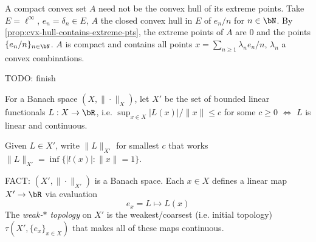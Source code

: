 \begin{example}
  A compact convex set $A$ need not be the convex hull of its extreme points.
  Take $E = \ell^\infty$, $e_n = \delta_n \in E$, $A$ the closed
  convex hull in $E$ of $e_n / n$ for $n \in \bN$.
  By \cref{prop:cvx-hull-contains-extreme-pts}, the extreme points
  of $A$ are $0$ and the points $\{e_n / n\}_{n \in \bN}$.
  $A$ is compact and contains all points $x = \sum_{n \geq 1} \lambda_n e_n / n$,
  $\lambda_n$ a convex combinations.

  TODO: finish
\end{example}

\begin{definition}
  For a Banach space $(X, \|\cdot\|_X)$, let $X'$ be the set of bounded
  linear functionals $L : X \to \bR$, i.e.
  $\sup_{x \in X} \lvert L(x) \rvert / \|x\| \leq c$ for some $c \geq 0$
  $\iff$ $L$ is linear and continuous.

  Given $L \in X'$, write $\|L\|_{X'}$ for smallest $c$
  that works $\|L\|_{X'} = \inf \{\lvert l(x) \rvert : \|x\| = 1\}$.

  FACT: $(X', \|\cdot\|_{X'})$ is a Banach space.
  Each $x \in X$ defines a linear map $X' \to \bR$ via evaluation
  \[
    e_x = L \mapsto L(x)
  \]
  The \emph{weak-$\ast$ topology} on $X'$ is the weakest/coarsest
  (i.e. initial topology) $\tau(X', \{e_x\}_{x \in X})$ that makes all of these
  maps continuous.
\end{definition}

